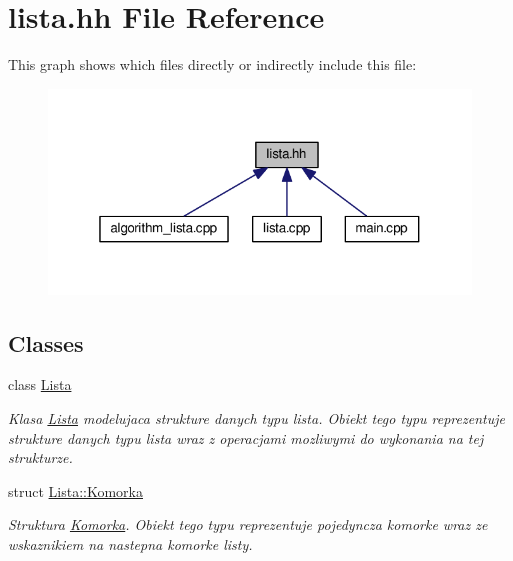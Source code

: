 \hypertarget{lista_8hh}{\section{lista.\-hh File Reference}
\label{lista_8hh}
}
This graph shows which files directly or indirectly include this file\-:\nopagebreak
\begin{figure}[H]
\begin{center}
\leavevmode
\includegraphics[width=323pt]{lista_8hh__dep__incl}
\end{center}
\end{figure}
\subsection*{Classes}
\begin{DoxyCompactItemize}
\item 
class \hyperlink{class_lista}{Lista}
\begin{DoxyCompactList}\small\item\em Klasa \hyperlink{class_lista}{Lista} modelujaca strukture danych typu lista. Obiekt tego typu reprezentuje strukture danych typu lista wraz z operacjami mozliwymi do wykonania na tej strukturze. \end{DoxyCompactList}\item 
struct \hyperlink{struct_lista_1_1_komorka}{Lista\-::\-Komorka}
\begin{DoxyCompactList}\small\item\em Struktura \hyperlink{struct_lista_1_1_komorka}{Komorka}. Obiekt tego typu reprezentuje pojedyncza komorke wraz ze wskaznikiem na nastepna komorke listy. \end{DoxyCompactList}\end{DoxyCompactItemize}
